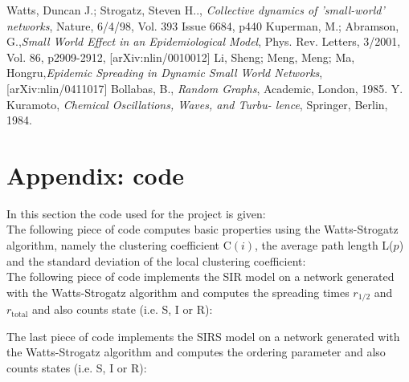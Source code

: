 \documentclass[10pt,a4paper]{article}
\begin{document}
\begin{thebibliography}{5}
  Watts, Duncan J.; Strogatz, Steven H.., \emph{Collective dynamics of 'small-world' networks}, Nature, 6/4/98, Vol. 393 Issue 6684, p440
  Kuperman, M.; Abramson, G.,\emph{Small World Effect in an Epidemiological Model}, Phys. Rev. Letters, 3/2001, Vol. 86, p2909-2912, [arXiv:nlin/0010012]
  Li, Sheng; Meng, Meng; Ma, Hongru,\emph{Epidemic Spreading in Dynamic Small World Networks}, [arXiv:nlin/0411017]
  Bollabas, B., \emph{Random Graphs}, Academic, London, 1985.
  Y. Kuramoto, \emph{Chemical Oscillations, Waves, and Turbu-
lence}, Springer, Berlin, 1984.
\end{thebibliography}
  
\section{Appendix: code}

\noindent In this section the code used for the project is given:\\
\noindent The following piece of code computes basic properties using the Watts-Strogatz algorithm, namely the clustering coefficient C$(i)$, the average path length L($p$) and the standard deviation of the local clustering coefficient:\\


\noindent The following piece of code implements the SIR model on a network generated with the Watts-Strogatz algorithm and computes the spreading times $r_{1/2}$ and $r_{\text{total}}$ and also counts state (i.e. S, I or R):


\noindent The last piece of code implements the SIRS model on a network generated with the Watts-Strogatz algorithm and computes the ordering parameter and also counts states (i.e. S, I or R):

\end{document}
